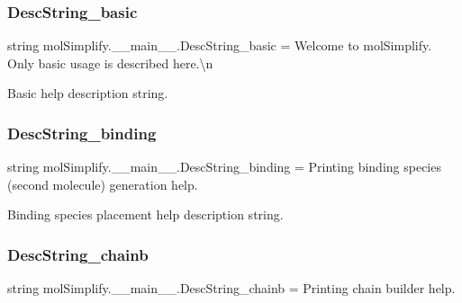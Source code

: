 \subsubsection{\texorpdfstring{Desc\+String\+\_\+basic}{DescString\_basic}}
{\footnotesize\ttfamily string mol\+Simplify.\+\_\+\+\_\+main\+\_\+\+\_\+.\+Desc\+String\+\_\+basic = \textquotesingle{}Welcome to mol\+Simplify. Only basic usage is described here.\textbackslash{}n\textquotesingle{}}



Basic help description string. 

\mbox{\label{namespacemolSimplify_1_1____main_____a66178dfe9e4007b22bd17c4e05c1fb00}} 
\subsubsection{\texorpdfstring{Desc\+String\+\_\+binding}{DescString\_binding}}
{\footnotesize\ttfamily string mol\+Simplify.\+\_\+\+\_\+main\+\_\+\+\_\+.\+Desc\+String\+\_\+binding = \textquotesingle{}Printing binding species (second molecule) generation help.\textquotesingle{}}



Binding species placement help description string. 

\mbox{\label{namespacemolSimplify_1_1____main_____a44fcd92cdc8efbe8ae3581dfca56309c}} 
\subsubsection{\texorpdfstring{Desc\+String\+\_\+chainb}{DescString\_chainb}}
{\footnotesize\ttfamily string mol\+Simplify.\+\_\+\+\_\+main\+\_\+\+\_\+.\+Desc\+String\+\_\+chainb = \textquotesingle{}Printing chain builder help.\textquotesingle{}}



